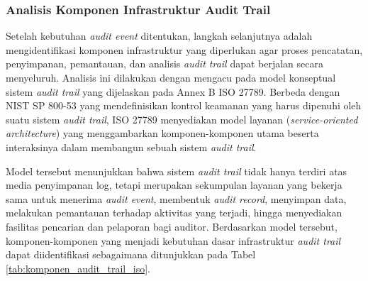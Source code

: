 \subsubsection{Analisis Komponen Infrastruktur Audit Trail}

Setelah kebutuhan \textit{audit event} ditentukan, langkah selanjutnya adalah mengidentifikasi komponen infrastruktur yang diperlukan agar proses pencatatan, penyimpanan, pemantauan, dan analisis \textit{audit trail} dapat berjalan secara menyeluruh. Analisis ini dilakukan dengan mengacu pada model konseptual sistem \textit{audit trail} yang dijelaskan pada Annex B ISO 27789. Berbeda dengan NIST SP 800-53 yang mendefinisikan kontrol keamanan yang harus dipenuhi oleh suatu sistem \textit{audit trail}, ISO 27789 menyediakan model layanan (\textit{service-oriented architecture}) yang menggambarkan komponen-komponen utama beserta interaksinya dalam membangun sebuah sistem \textit{audit trail}.

Model tersebut menunjukkan bahwa sistem \textit{audit trail} tidak hanya terdiri atas media penyimpanan log, tetapi merupakan sekumpulan layanan yang bekerja sama untuk menerima \textit{audit event}, membentuk \textit{audit record}, menyimpan data, melakukan pemantauan terhadap aktivitas yang terjadi, hingga menyediakan fasilitas pencarian dan pelaporan bagi auditor. Berdasarkan model tersebut, komponen-komponen yang menjadi kebutuhan dasar infrastruktur \textit{audit trail} dapat diidentifikasi sebagaimana ditunjukkan pada Tabel \ref{tab:komponen_audit_trail_iso}.

